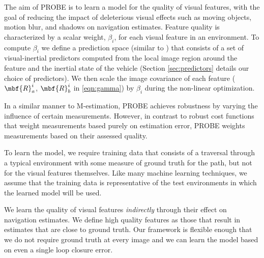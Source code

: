The aim of PROBE is to learn a model for the quality of visual features, with the goal of reducing the impact of deleterious visual effects such as moving objects, motion blur, and shadows on navigation estimates.
Feature quality is characterized by a scalar weight, $\beta_i$, for each visual feature in an environment.
To compute $\beta_i$ we define a prediction space (similar to \cite{VegaBrown:ew}) that consists of a set of visual-inertial predictors computed from the local image region around the feature and the inertial state of the vehicle (Section \ref{sec:predictors} details our choice of predictors).
We then scale the image covariance of each feature ($\mbf{R}_a^{i}$, $\mbf{R}_b^{i}$ in \ref{eqn:gamma}) by $\beta_i$ during the non-linear optimization.

In a similar manner to M-estimation, PROBE achieves robustness by varying the influence of certain measurements.
However, in contrast to robust cost functions that weight measurements based purely on estimation error, PROBE weights measurements based on their assessed quality.

To learn the model, we require training data that consists of a traversal through a typical environment with some measure of ground truth for the path, but not for the visual features themselves. Like many machine learning techniques, we assume that the training data is representative of the test environments in which the learned model will be used. 

We learn the quality of visual features \textit{indirectly} through their effect on navigation estimates. We define high quality features as those that result in estimates that are close to ground truth. Our framework is flexible enough that we do not require ground truth at every image and we can learn the model based on even a single loop closure error.

